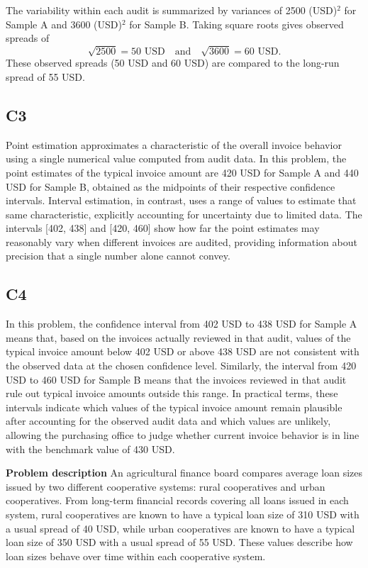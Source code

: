 \begin{ExamProblems}
		The variability within each audit is summarized by variances of 2500 (USD)$^2$ for Sample A and 3600 (USD)$^2$ for Sample B. Taking square roots gives observed spreads of
		\[
		\sqrt{2500} = 50 \text{ USD} \quad \text{and} \quad \sqrt{3600} = 60 \text{ USD}.
		\]
		These observed spreads (50 USD and 60 USD) are compared to the long-run spread of 55 USD.
		
		\subsection*{C3}
		Point estimation approximates a characteristic of the overall invoice behavior using a single numerical value computed from audit data. In this problem, the point estimates of the typical invoice amount are 420 USD for Sample A and 440 USD for Sample B, obtained as the midpoints of their respective confidence intervals. Interval estimation, in contrast, uses a range of values to estimate that same characteristic, explicitly accounting for uncertainty due to limited data. The intervals [402, 438] and [420, 460] show how far the point estimates may reasonably vary when different invoices are audited, providing information about precision that a single number alone cannot convey.
		
		\subsection*{C4}
		In this problem, the confidence interval from 402 USD to 438 USD for Sample A means that, based on the invoices actually reviewed in that audit, values of the typical invoice amount below 402 USD or above 438 USD are not consistent with the observed data at the chosen confidence level. Similarly, the interval from 420 USD to 460 USD for Sample B means that the invoices reviewed in that audit rule out typical invoice amounts outside this range. In practical terms, these intervals indicate which values of the typical invoice amount remain plausible after accounting for the observed audit data and which values are unlikely, allowing the purchasing office to judge whether current invoice behavior is in line with the benchmark value of 430 USD.
		
		\newpage
		\item
		\textbf{Problem description}
		An agricultural finance board compares average loan sizes issued by two different cooperative systems: rural cooperatives and urban cooperatives. From long-term financial records covering all loans issued in each system, rural cooperatives are known to have a typical loan size of 310 USD with a usual spread of 40 USD, while urban cooperatives are known to have a typical loan size of 350 USD with a usual spread of 55 USD. These values describe how loan sizes behave over time within each cooperative system.
		

\end{ExamProblems}
